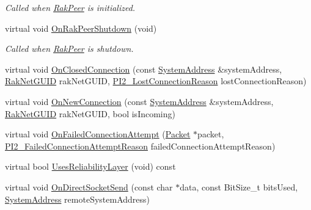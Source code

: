 \begin{DoxyCompactItemize}
\begin{DoxyCompactList}\small\item\em Called when \hyperlink{class_rak_net_1_1_rak_peer}{Rak\-Peer} is initialized. \end{DoxyCompactList}\item 
\hypertarget{class_rak_net_1_1_plugin_interface2_a37c873a1879871722e06acfc45923883}{virtual void \hyperlink{class_rak_net_1_1_plugin_interface2_a37c873a1879871722e06acfc45923883}{On\-Rak\-Peer\-Shutdown} (void)}\label{class_rak_net_1_1_plugin_interface2_a37c873a1879871722e06acfc45923883}

\begin{DoxyCompactList}\small\item\em Called when \hyperlink{class_rak_net_1_1_rak_peer}{Rak\-Peer} is shutdown. \end{DoxyCompactList}\item 
virtual void \hyperlink{class_rak_net_1_1_plugin_interface2_a80c7612ca1a5dcfeec0b52d8049a71ea}{On\-Closed\-Connection} (const \hyperlink{struct_rak_net_1_1_system_address}{System\-Address} \&system\-Address, \hyperlink{struct_rak_net_1_1_rak_net_g_u_i_d}{Rak\-Net\-G\-U\-I\-D} rak\-Net\-G\-U\-I\-D, \hyperlink{group___p_l_u_g_i_n___i_n_t_e_r_f_a_c_e___g_r_o_u_p_ga376cc546fd6892c2ead48cd51796c8b8}{P\-I2\-\_\-\-Lost\-Connection\-Reason} lost\-Connection\-Reason)
\item 
virtual void \hyperlink{class_rak_net_1_1_plugin_interface2_abf13327cc10f772ba06dff8f2687f8ae}{On\-New\-Connection} (const \hyperlink{struct_rak_net_1_1_system_address}{System\-Address} \&system\-Address, \hyperlink{struct_rak_net_1_1_rak_net_g_u_i_d}{Rak\-Net\-G\-U\-I\-D} rak\-Net\-G\-U\-I\-D, bool is\-Incoming)
\item 
virtual void \hyperlink{class_rak_net_1_1_plugin_interface2_a9504489498df14b6efa5ca9bd39aede4}{On\-Failed\-Connection\-Attempt} (\hyperlink{struct_rak_net_1_1_packet}{Packet} $\ast$packet, \hyperlink{group___p_l_u_g_i_n___i_n_t_e_r_f_a_c_e___g_r_o_u_p_ga3e92f686bace869b78c10508c58e0825}{P\-I2\-\_\-\-Failed\-Connection\-Attempt\-Reason} failed\-Connection\-Attempt\-Reason)
\item 
virtual bool \hyperlink{class_rak_net_1_1_plugin_interface2_accfca7d25262c48a87a30114383284aa}{Uses\-Reliability\-Layer} (void) const 
\item 
virtual void \hyperlink{class_rak_net_1_1_plugin_interface2_a7a6f69c6fc3a121e3676298a63a9ef78}{On\-Direct\-Socket\-Send} (const char $\ast$data, const Bit\-Size\-\_\-t bits\-Used, \hyperlink{struct_rak_net_1_1_system_address}{System\-Address} remote\-System\-Address)

\end{DoxyCompactItemize}
